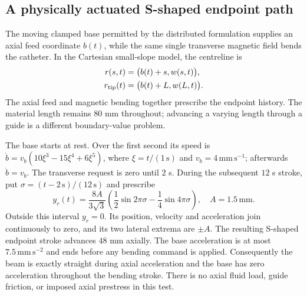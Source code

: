 \subsection{A physically actuated S-shaped endpoint path}
\label{sec:s-path}
The moving clamped base permitted by the distributed formulation supplies
an axial feed coordinate $b(t)$, while the same single transverse magnetic
field bends the catheter. In the Cartesian small-slope model,
the centreline is
\begin{equation}
 \begin{aligned}
 r(s,t)&=\bigl(b(t)+s,w(s,t)\bigr),\\
 r_{\rm tip}(t)&=\bigl(b(t)+L,w(L,t)\bigr).
 \end{aligned}
 \label{eq:s-path-geometry}
\end{equation}
The axial feed and magnetic bending together prescribe the endpoint
history. The material length remains
$80$ mm throughout; advancing a varying length through a guide is a
different boundary-value problem.

The base starts at rest. Over the first second its speed is
$\dot b=v_b(10\xi^3-15\xi^4+6\xi^5)$, where $\xi=t/(1\,\mathrm{s})$
and $v_b=4\,\mathrm{mm\,s^{-1}}$; afterwards $\dot b=v_b$.
The transverse request is zero until $2$ s. During the subsequent
$12$ s stroke, put $\sigma=(t-2\,\mathrm{s})/(12\,\mathrm{s})$ and prescribe
\begin{equation}
 y_r(t)=\frac{8A}{3\sqrt3}
       \left(\frac12\sin 2\pi\sigma-\frac14\sin4\pi\sigma\right),
 \quad A=1.5\,\mathrm{mm}.
 \label{eq:s-path-reference}
\end{equation}
Outside this interval $y_r=0$. Its position, velocity and acceleration
join continuously to zero, and its two lateral extrema are $\pm A$.
The resulting S-shaped endpoint stroke advances $48$ mm axially.
The base acceleration is at most $7.5\,\mathrm{mm\,s^{-2}}$ and ends
before any bending command is applied. Consequently the beam is exactly
straight during axial acceleration and the base has zero acceleration
throughout the bending stroke. There is no axial fluid load, guide friction,
or imposed axial prestress in this test.

